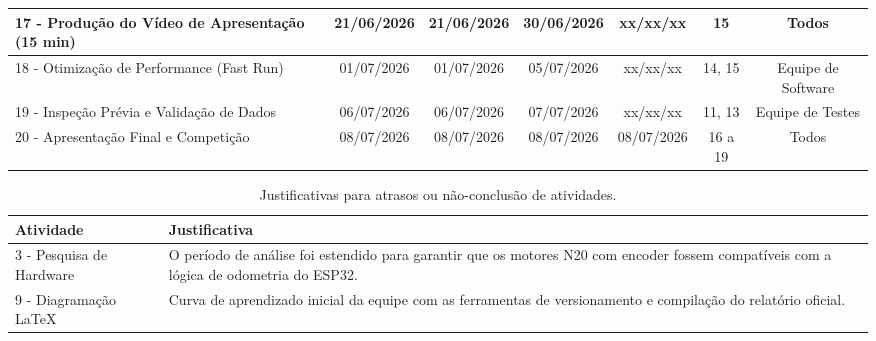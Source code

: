 \begin{landscape}
\begin{table}[htpb]
\begin{center}
{\begin{tabular}{|l|c|c|c|c|c|c|}
17 - Produção do Vídeo de Apresentação (15 min) & 21/06/2026 & 21/06/2026 & 30/06/2026 & xx/xx/xx & 15 & Todos \\ \hline
18 - Otimização de Performance (Fast Run) & 01/07/2026 & 01/07/2026 & 05/07/2026 & xx/xx/xx & 14, 15 & Equipe de Software \\ \hline
19 - Inspeção Prévia e Validação de Dados & 06/07/2026 & 06/07/2026 & 07/07/2026 & xx/xx/xx & 11, 13 & Equipe de Testes \\ \hline
20 - Apresentação Final e Competição & 08/07/2026 & 08/07/2026 & 08/07/2026 & 08/07/2026 & 16 a 19 & Todos \\ \hline

\end{tabular}
}

\end{center}
\end{table}

\newpage

\begin{table}[htpb]
\begin{center}
\caption{Justificativas para atrasos ou não-conclusão de atividades.}

\begin{tabular}{|p{4cm}|p{10cm}|}
\hline
\textbf{Atividade} & \textbf{Justificativa} \\ \hline
3 - Pesquisa de Hardware & O período de análise foi estendido para garantir que os motores N20 com encoder fossem compatíveis com a lógica de odometria do ESP32. \\ \hline
9 - Diagramação LaTeX & Curva de aprendizado inicial da equipe com as ferramentas de versionamento e compilação do relatório oficial.\\ \hline
\end{tabular}
\end{center}
\end{table}

\end{landscape}